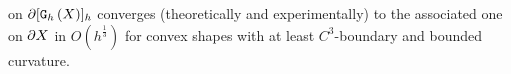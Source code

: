 \documentclass{llncs}
\begin{document}
on $\partial \lbrack \mathtt{G}_{h}\left(X\right) \rbrack_{h}$ converges (theoretically and experimentally) to the
\color{blue}
associated one on $\partial X$ in $O\left(h^{\frac{1}{3}}\right)$ for
convex shapes with at least $C^3$-boundary and bounded curvature.
\normalcolor
%
%
\end{document}

